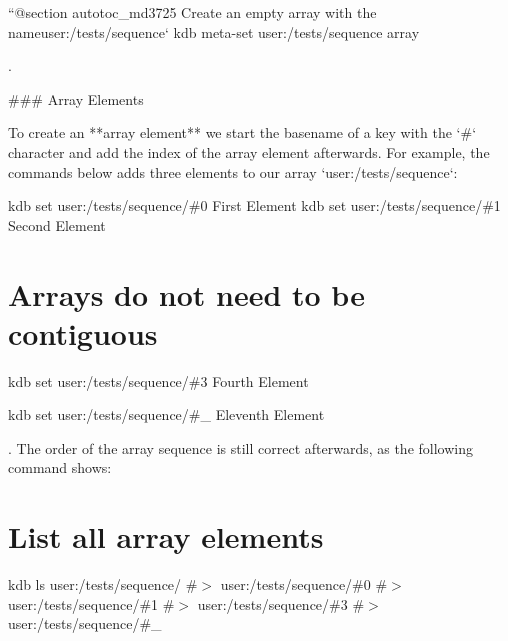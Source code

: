 ``{\ttfamily  @section autotoc\+\_\+md3725 Create an empty array with the name}user\+:/tests/sequence` kdb meta-\/set user\+:/tests/sequence array \textquotesingle{}\textquotesingle{} 
\begin{DoxyCode}
.

### Array Elements

To create an **array element** we start the basename of a key with the `#` character and add the index of
       the array element afterwards. For example, the commands below adds three elements to our array
       `user:/tests/sequence`:
\end{DoxyCode}
 kdb set user\+:/tests/sequence/\#0 \textquotesingle{}First Element\textquotesingle{} kdb set user\+:/tests/sequence/\#1 \textquotesingle{}Second Element\textquotesingle{} \hypertarget{doc_tutorials_arrays_md_autotoc_md3726}{}\section{Arrays do not need to be contiguous}\label{doc_tutorials_arrays_md_autotoc_md3726}
kdb set user\+:/tests/sequence/\#3 \textquotesingle{}Fourth Element\textquotesingle{} 
 kdb set user\+:/tests/sequence/\#\+\_ \textquotesingle{}Eleventh Element\textquotesingle{} 
\begin{DoxyCode}
. The order of the array sequence is still correct afterwards, as the following command shows:
\end{DoxyCode}
 \hypertarget{doc_tutorials_arrays_md_autotoc_md3727}{}\section{List all array elements}\label{doc_tutorials_arrays_md_autotoc_md3727}
kdb ls user\+:/tests/sequence/ \#$>$ user\+:/tests/sequence/\#0 \#$>$ user\+:/tests/sequence/\#1 \#$>$ user\+:/tests/sequence/\#3 \#$>$ user\+:/tests/sequence/\#\+\_ 
